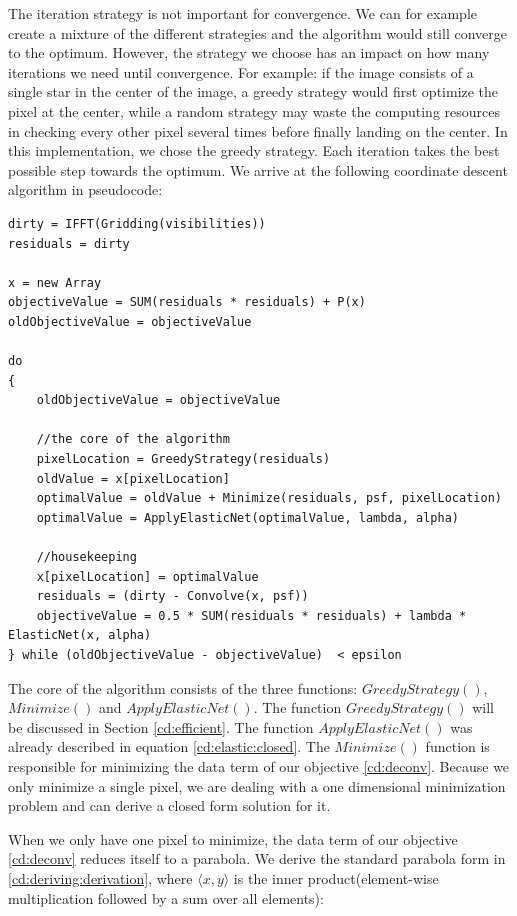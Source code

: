 The iteration strategy is not important for convergence. We can for example create a mixture of the different strategies and the algorithm would still converge to the optimum. However, the strategy we choose has an impact on how many iterations we need until convergence. For example: if the image consists of a single star in the center of the image, a greedy strategy would first optimize the pixel at the center, while a random strategy may waste the computing resources in checking every other pixel several times before finally landing on the center. In this implementation, we chose the greedy strategy. Each iteration takes the best possible step towards the optimum. We arrive at the following coordinate descent algorithm in pseudocode:


\begin{lstlisting}
dirty = IFFT(Gridding(visibilities))
residuals = dirty

x = new Array
objectiveValue = SUM(residuals * residuals) + P(x)
oldObjectiveValue = objectiveValue

do 
{
	oldObjectiveValue = objectiveValue

	//the core of the algorithm
	pixelLocation = GreedyStrategy(residuals)
	oldValue = x[pixelLocation]
	optimalValue = oldValue + Minimize(residuals, psf, pixelLocation)
	optimalValue = ApplyElasticNet(optimalValue, lambda, alpha)
	
	//housekeeping
	x[pixelLocation] = optimalValue
	residuals = (dirty - Convolve(x, psf))
	objectiveValue = 0.5 * SUM(residuals * residuals) + lambda * ElasticNet(x, alpha)
} while (oldObjectiveValue - objectiveValue)  < epsilon
\end{lstlisting}

The core of the algorithm consists of the three functions: $GreedyStrategy()$, $Minimize()$ and $ApplyElasticNet()$. The function $GreedyStrategy()$ will be discussed in Section \ref{cd:efficient}. The function $ApplyElasticNet()$ was already described in equation \eqref{cd:elastic:closed}. The $Minimize()$ function is responsible for minimizing the data term of our objective \eqref{cd:deconv}. Because we only minimize a single pixel, we are dealing with a one dimensional minimization problem and can derive a closed form solution for it.

When we only have one pixel to minimize, the data term of our objective \eqref{cd:deconv} reduces itself to a parabola. We derive the standard parabola form in \eqref{cd:deriving:derivation}, where $\langle x, y\rangle$ is the inner product(element-wise multiplication followed by a sum over all elements):

